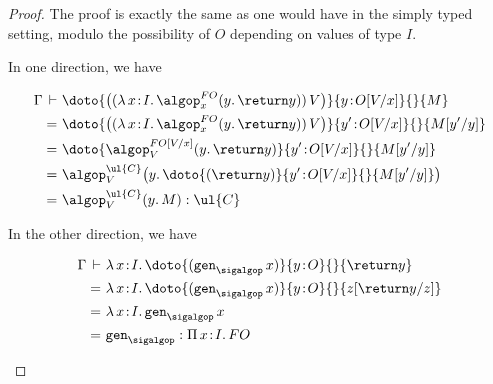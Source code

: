 \begin{proof}
The proof is exactly the same as one would have in the simply typed setting, modulo the possibility of $O$ depending on values of type $I$.

In one direction, we have
\begin{fleqn}[0.3cm]
\begin{align*}
\Gamma \,\vdash\,\, & \doto {\big((\lambda\, x \!:\! I .\, \algop^{FO}_x(y.\, \return y))\, V\big)} {y \!:\! O[V/x]} {} {M}
\\
=\,\, & \doto {\big((\lambda\, x \!:\! I .\, \algop^{FO}_x(y.\, \return y))\, V\big)} {y' \!:\! O[V/x]} {} {M[y'/y]}
\\
=\,\, & \doto {\algop^{FO[V/x]}_V(y.\, \return y)} {y' \!:\! O[V/x]} {} {M[y'/y]}
\\
=\,\, & \algop^{\ul{C}}_V\big(y.\, \doto {(\return y)} {y' \!:\! O[V/x]} {} {M[y'/y]}\big)
\\
=\,\, & \algop^{\ul{C}}_V(y.\, M) : \ul{C}
\end{align*}
\end{fleqn}

In the other direction, we have 
\begin{fleqn}[0.3cm]
\begin{align*}
\Gamma \,\vdash\,\, & \lambda\, x \!:\! I .\, \doto {(\mathtt{gen}_{\sigalgop}\, x)} {y \!:\! O} {} {\return y}
\\
=\,\, & \lambda\, x \!:\! I .\, \doto {(\mathtt{gen}_{\sigalgop}\, x)} {y \!:\! O} {} {z[\return y/z]}
\\
=\,\, & \lambda\, x \!:\! I .\, \mathtt{gen}_{\sigalgop}\, x
\\
=\,\, & \mathtt{gen}_{\sigalgop} : \Pi\, x \!:\! I .\, FO
\end{align*}
\end{fleqn}
\end{proof}


